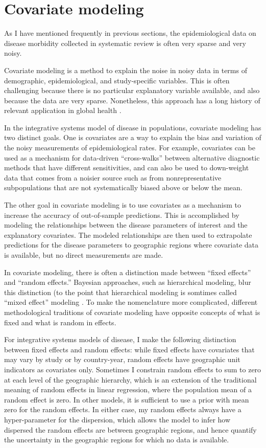 \chapter{Covariate modeling}

As I have mentioned frequently in previous sections, the
epidemiological data on disease morbidity collected in systematic
review is often very sparse and very noisy.

Covariate modeling is a method to explain the noise in noisy
data in terms of demographic, epidemiological, and study-specific
variables.  This is often challenging because there is no particular
explanatory variable available, and also because the data are very
sparse.  Nonetheless, this approach has a long history of relevant
application in global health \cite{Girosi_Demographic_2008,Wakefield_Bayesian_1996}.

In the integrative systems model of disease in populations, covariate
modeling has two distinct goals.  One is covariates are a way to
explain the bias and variation of the noisy measurements of
epidemiological rates.  For example, covariates can be used as a mechanism
for data-driven ``cross-walks'' between alternative diagnostic methods
that have different sensitivities, and can also be used to 
down-weight data that comes from a noisier source such as
from nonrepresentative subpopulations that are not systematically
biased above or below the mean.

The other goal in covariate modeling is to use covariates as a
mechanism to increase the accuracy of out-of-sample predictions.  This
is accomplished by modeling the relationships between the disease
parameters of interest and the explanatory covariates. The modeled
relationships are then used to extrapolate predictions for the disease
parameters to geographic regions where covariate data is available,
but no direct measurements are made.

In covariate modeling, there is often a distinction made between
``fixed effects'' and ``random effects.''  Bayesian approaches, such
as hierarchical modeling, blur this distinction (to the point that
hierarchical modeling is somtimes called ``mixed effect'' modeling
\cite{Gelman_Multilevel_2005}.  To make the nomenclature more
complicated, different methodological traditions of covariate modeling
have opposite concepts of what is fixed and what is random in effects.

For integrative systems models of disease, I make the following
distinction between fixed effects and random effects: while fixed
effects have covariates that may vary by study or by country-year,
random effects have geographic unit indicators as covariates only.
Sometimes I constrain random effects to sum to zero at each level of
the geographic hierarchy, which is an extension of the traditional
meaning of random effects in linear regression, where the population
mean of a random effect is zero.  In other models, it is sufficient to
use a prior with mean zero for the random effects.  In either case,
my random effects always have a hyper-parameter for the dispersion,
which allows the model to infer how dispersed the random effects are
between geographic regions, and hence quantify the uncertainty in the
geographic regions for which no data is available.


